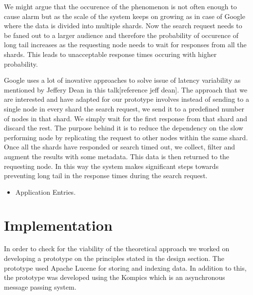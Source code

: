 \documentclass[12pt,a4paper,twoside,openright]{book}
\begin{document}
\par We might argue that the occurence of the phenomenon is not often enough to cause alarm but as the scale of the system keeps on growing as in case of Google where the data is divided into multiple shards. Now the search request needs to be faned out to a larger audience and therefore the probability of occurence of long tail increases as the requesting node needs to wait for responses from all the shards. This leads to unacceptable response times occuring with higher probability. 

\par Google uses a lot of inovative approaches to solve issue of latency variability as mentioned by Jeffery Dean in this talk[reference jeff dean]. The approach that we are interested and have adapted for our prototype involves instead of sending to a single node in every shard the search request, we send it to a predefined number of nodes in that shard. We simply wait for the first response from that shard and discard the rest. The purpose behind it is to reduce the dependency on the slow performing node by replicating the request to other nodes within the same shard. Once all the shards have responded or search timed out, we collect, filter and augment the results with some metadata. This data is then returned to the requesting node. In this way the system makes significant steps towards preventing long tail in the response times during the search request.

\begin{itemize}

\item Application Entries.

\end{itemize}


\chapter{Implementation}
\label{sec:impl}

In order to check for the viability of the theoretical approach we worked on developing a prototype on the principles stated in the design section. The prototype used Apache Lucene for storing and indexing data. In addition to this, the prototype was developed using the Kompics which is an asynchronous message passing system. 
\end{document}

